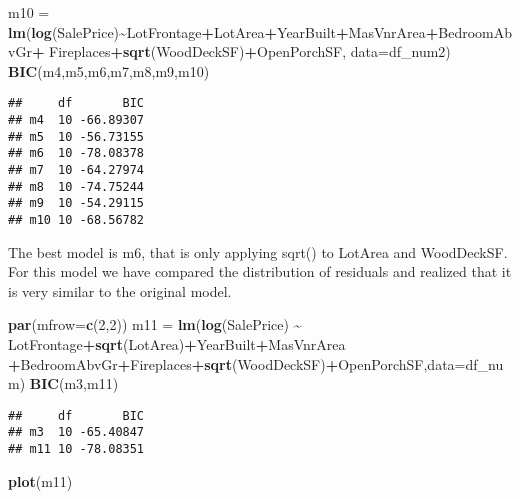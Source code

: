 \documentclass[
]{article}
\newenvironment{Shaded}{\begin{snugshade}}{\end{snugshade}}
\newcommand{\AttributeTok}[1]{\textcolor[rgb]{0.13,0.29,0.53}{#1}}
\newcommand{\DecValTok}[1]{\textcolor[rgb]{0.00,0.00,0.81}{#1}}
\newcommand{\FunctionTok}[1]{\textcolor[rgb]{0.13,0.29,0.53}{\textbf{#1}}}
\newcommand{\NormalTok}[1]{#1}
\newcommand{\OtherTok}[1]{\textcolor[rgb]{0.56,0.35,0.01}{#1}}
\newcommand{\SpecialCharTok}[1]{\textcolor[rgb]{0.81,0.36,0.00}{\textbf{#1}}}
\begin{document}
\begin{Shaded}
\begin{Highlighting}[]
\NormalTok{m10 }\OtherTok{=} \FunctionTok{lm}\NormalTok{(}\FunctionTok{log}\NormalTok{(SalePrice)}\SpecialCharTok{\textasciitilde{}}\NormalTok{LotFrontage}\SpecialCharTok{+}\NormalTok{LotArea}\SpecialCharTok{+}\NormalTok{YearBuilt}\SpecialCharTok{+}\NormalTok{MasVnrArea}\SpecialCharTok{+}\NormalTok{BedroomAbvGr}\SpecialCharTok{+}
\NormalTok{           Fireplaces}\SpecialCharTok{+}\FunctionTok{sqrt}\NormalTok{(WoodDeckSF)}\SpecialCharTok{+}\NormalTok{OpenPorchSF, }\AttributeTok{data=}\NormalTok{df\_num2)}
\FunctionTok{BIC}\NormalTok{(m4,m5,m6,m7,m8,m9,m10)}
\end{Highlighting}
\end{Shaded}

\begin{verbatim}
##     df       BIC
## m4  10 -66.89307
## m5  10 -56.73155
## m6  10 -78.08378
## m7  10 -64.27974
## m8  10 -74.75244
## m9  10 -54.29115
## m10 10 -68.56782
\end{verbatim}

The best model is m6, that is only applying sqrt() to LotArea and
WoodDeckSF. For this model we have compared the distribution of
residuals and realized that it is very similar to the original model.

\begin{Shaded}
\begin{Highlighting}[]
\FunctionTok{par}\NormalTok{(}\AttributeTok{mfrow=}\FunctionTok{c}\NormalTok{(}\DecValTok{2}\NormalTok{,}\DecValTok{2}\NormalTok{))}
\NormalTok{m11 }\OtherTok{=} \FunctionTok{lm}\NormalTok{(}\FunctionTok{log}\NormalTok{(SalePrice) }\SpecialCharTok{\textasciitilde{}}\NormalTok{ LotFrontage}\SpecialCharTok{+}\FunctionTok{sqrt}\NormalTok{(LotArea)}\SpecialCharTok{+}\NormalTok{YearBuilt}\SpecialCharTok{+}\NormalTok{MasVnrArea}
         \SpecialCharTok{+}\NormalTok{BedroomAbvGr}\SpecialCharTok{+}\NormalTok{Fireplaces}\SpecialCharTok{+}\FunctionTok{sqrt}\NormalTok{(WoodDeckSF)}\SpecialCharTok{+}\NormalTok{OpenPorchSF,}\AttributeTok{data=}\NormalTok{df\_num)}
\FunctionTok{BIC}\NormalTok{(m3,m11)}
\end{Highlighting}
\end{Shaded}

\begin{verbatim}
##     df       BIC
## m3  10 -65.40847
## m11 10 -78.08351
\end{verbatim}

\begin{Shaded}
\begin{Highlighting}[]
\FunctionTok{plot}\NormalTok{(m11)}
\end{Highlighting}
\end{Shaded}
\end{document}

